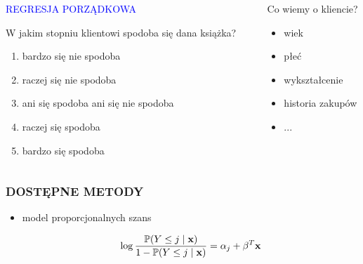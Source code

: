 \documentclass[11pt,usenames,dvipsnames,rgb,svgnames,x11names]{beamer}
\theoremstyle{plain}
\theoremstyle{definition}
\theoremstyle{remark}
\begin{document}
\begin{frame}
\begin{columns}[T]
\begin{column}{0.4\textwidth}
\begin{center}
\textcolor{blue}{REGRESJA PORZĄDKOWA}
\end{center}
W jakim stopniu klientowi spodoba się dana książka?
\begin{enumerate}[1)]
\item \textcolor{jeden}{bardzo się nie spodoba}
\item \textcolor{dwa}{raczej się nie spodoba}
\item \textcolor{trzy}{ani się spodoba ani się nie spodoba}
\item \textcolor{cztery}{raczej się spodoba}
\item \textcolor{piec}{bardzo się spodoba}
\end{enumerate}
\end{column}
\hspace{-4mm}
\textcolor{szary}{\vrule{}}
\hspace{1mm}
\begin{column}{0.3\textwidth}
\vspace{1cm}
Co wiemy o kliencie?
\vspace{0.5cm}
\begin{itemize}
\item wiek
\item płeć
\item wykształcenie
\item historia zakupów
\item ...
\end{itemize}
\end{column}
  
\end{columns}  
  
\end{frame}

\begin{frame}
\frametitle{\textbf{DOSTĘPNE METODY}}
\begin{itemize}

\item model proporcjonalnych szans

$$
\log\dfrac{\mathbb{P}(Y\leq j \hspace{1mm}|\hspace{1mm} \mathbf{x})}{1-\mathbb{P}(Y\leq j \hspace{1mm}|\hspace{1mm} \mathbf{x})} = \alpha_j+\mathbf{\beta}^T\mathbf{x}
$$

\end{itemize}
\end{frame}
\end{document}
